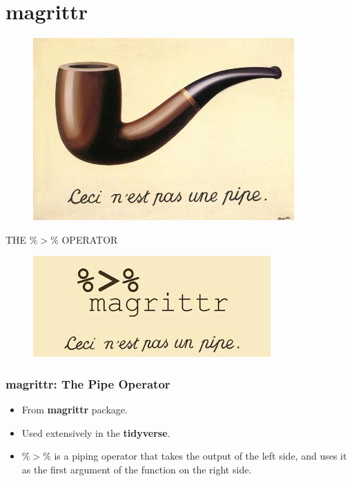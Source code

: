 \documentclass{beamer}
\begin{document}
\section{magrittr}
\begin{frame}
	\begin{figure}
		\centering
		\includegraphics[width=0.99\linewidth]{images/pipe}
		
	\end{figure}
	\begin{center}
		{\huge THE $ \%>\% $ OPERATOR}
	\end{center}
\end{frame}
\begin{frame}
	\begin{figure}
		\centering
		\includegraphics[width=0.99\linewidth]{images/pipe2}
		
	\end{figure}
\end{frame}
\begin{frame}[fragile]
\frametitle{magrittr: The Pipe Operator}
\Large
	\vspace{-1cm}
\begin{itemize}
		\item From \textbf{magrittr} package.  \smallskip
		\item Used extensively in the \textbf{tidyverse}. \smallskip
		\item \texttt{$\%>\%$} is a piping operator that takes the output of the left side, and uses it as the first argument of the function on the right side.
		
\end{itemize}
\end{frame}
\end{document}
